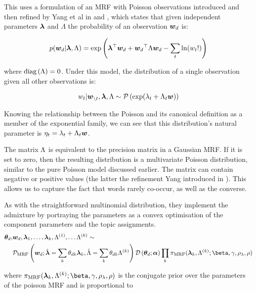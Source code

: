 This uses a formulation of an MRF with Poisson observations introduced and then refined by Yang et al in \cite{Yang2012} and \cite{Yang2013a}, which states that given independent parameters $\bm \lambda$ and $\Lambda$ the probability of an observation ${ \bm w_d }$ is:

\begin{align}
p({ \bm w_d }|\bm \lambda,\Lambda) = \exp\left(\bm \lambda^\top{  \bm w _d } + { \bm w_d }^\top\Lambda{  \bm w _d } - \sum_t \ln (w_t ! ) \right)
\end{align}

where $\text{diag} \left( {\Lambda} \right) = 0$. Under this model, the distribution of a single observation given all other observations is:

\begin{align}
w_t | \bm w_{\setminus t}, \bm \lambda, \Lambda  \sim \mathcal{P} \left( {\exp(\lambda_t + \Lambda_t \bm w)} \right)
\end{align}

Knowing the relationship between the Poisson and its canonical definition as a member of the exponential family, we can see that this distribution's natural parameter is $\eta_t = \lambda_t + \Lambda_t \bm w$. 

The matrix $\Lambda$ is equivalent to the precision matrix in a Gaussian MRF. If it is set to zero, then the resulting distribution is a multivariate Poisson distribution, similar to the pure Poisson model discussed earlier. The matrix can contain negative or positive values (the latter the refinement Yang introduced in \cite{Yang2013a}). This allows us to capture the fact that words rarely co-occur, as well as the converse.

As with the straightforward multinomial distribution, they implement the admixture by portraying the parameters as a convex optimisation of the component parameters and the topic assignments.
\begin{align} 
\begin{split}
\thd, &\wdoc, \vl_1, \ldots, \vl_k, \bl^{(1)}, \ldots \blk  \sim \\
& \mathcal{P}_{\text{MRF}}\left(\wdoc;  \hat{\vl} = \sum_k \thdk \vl_k, \hat{\bl} = \sum_k \thdk \blk \right)\dir{\thd; \vv{\alpha}}\prod_k \pi_{\text{MRF}}(\vl_k, \blk; \vv{\beta}, \gamma, \rho_\lambda, \rho)
\end{split}
\end{align}

where $\pi_{\text{MRF}}(\vl_k, \blk; \vv{\beta}, \gamma, \rho_\lambda, \rho)$ is the conjugate prior over the parameters of the poisson MRF and is proportional to

